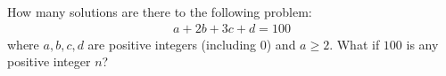 How many solutions are there to
the following problem:
\begin{align*}
a + 2b + 3c + d= 100
\end{align*}
where $a, b, c, d$ are positive integers (including $0$)
and $a \geq 2$.
What if $100$ is any positive integer $n$?
